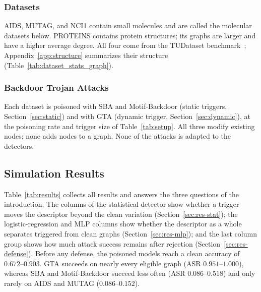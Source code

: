 \documentclass[journal]{IEEEtran}
\begin{document}
\subsubsection{Datasets}
AIDS, MUTAG, and NCI1 contain small molecules and are called the molecular
datasets below. PROTEINS contains protein structures; its graphs are larger and
have a higher average degree. All four come from the TUDataset
benchmark~\cite{tudataset}; Appendix~\ref{app:structure} summarizes their
structure (Table~\ref{tab:dataset_stats_graph}).

\subsubsection{Backdoor Trojan Attacks}
Each dataset is poisoned with SBA and Motif-Backdoor (static triggers,
Section~\ref{sec:static}) and with GTA (dynamic trigger,
Section~\ref{sec:dynamic}), at the poisoning rate and trigger size of
Table~\ref{tab:setup}. All three modify existing nodes; none adds nodes to a
graph. None of the attacks is adapted to the detectors.

\subsection{Simulation Results}
Table~\ref{tab:results} collects all results and answers the three questions
of the introduction. The columns of the statistical detector show whether a
trigger moves the descriptor beyond the clean variation
(Section~\ref{sec:res-stat}); the logistic-regression and MLP columns show
whether the descriptor as a whole separates triggered from clean graphs
(Section~\ref{sec:res-mlp}); and the last column group shows how much attack
success remains after rejection (Section~\ref{sec:res-defense}). Before any
defense, the poisoned models reach a clean
accuracy of $0.672$--$0.903$. GTA succeeds on nearly every eligible graph
(ASR $0.951$--$1.000$), whereas SBA and Motif-Backdoor succeed less often
(ASR $0.086$--$0.518$) and only rarely on AIDS and MUTAG ($0.086$--$0.152$).
\end{document}
